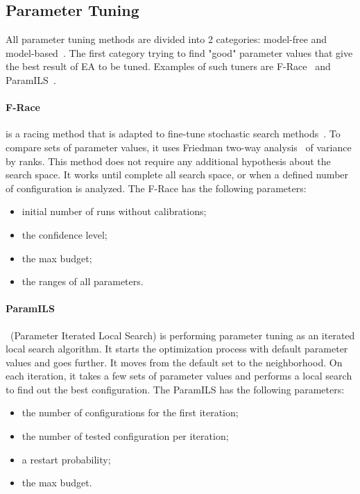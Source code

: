 \subsection{Parameter Tuning}\label{sec:parameterTuning}
All parameter tuning methods are divided into 2 categories: model-free and model-based~\cite{hutter2010}.
The first category trying to find "good" parameter values that give the best result of EA to be tuned. Examples of such tuners are F-Race~\cite{birattari2010f} and ParamILS~\cite{hutter2009paramils}.

\paragraph{F-Race} is a racing method that is adapted to fine-tune stochastic search methods~\cite{montero2012state}. To compare sets of parameter values, it uses Friedman two-way analysis~\cite{theodorsson87} of variance by ranks. This method does not require any additional hypothesis about the search space. It works until complete all search space, or when a defined number of configuration is analyzed. The F-Race has the following parameters:
\begin{itemize}
	\item initial number of runs without calibrations;
	\item the confidence level;
	\item the max budget;
	\item the ranges of all parameters.
\end{itemize}

\paragraph{ParamILS}~(Parameter Iterated Local Search) is performing parameter tuning as an iterated local search algorithm. It starts the optimization process with default parameter values and goes further. It moves from the default set to the neighborhood. On each iteration, it takes a few sets of parameter values and performs a local search to find out the best configuration. The ParamILS has the following parameters:
\begin{itemize}
	\item the number of configurations for the first iteration;
	\item the number of tested configuration per iteration;
	\item a restart probability;
	\item the max budget.
\end{itemize}


